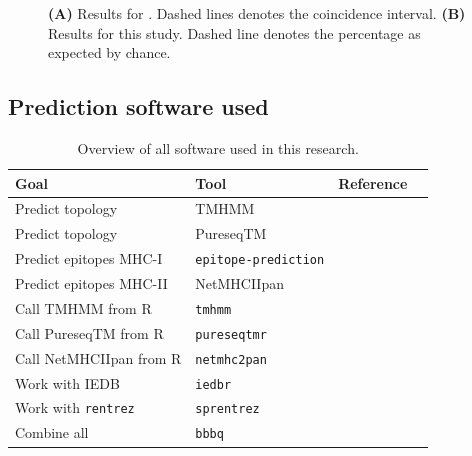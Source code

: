 \begin{figure}
  \caption{
    \textbf{(A)} 
    Results for \cite{bianchi2017}. 
    Dashed lines denotes the coincidence interval.
    \textbf{(B)}
    Results for this study.
    Dashed line denotes the percentage as expected by chance.
  }
\end{figure}

\clearpage

\subsection{Prediction software used}
\label{subsec:prediction_software_used}

\begin{table}[]
  \begin{tabular}{llll}
    Goal & Tool & Reference \\ 
    \hline
    Predict topology                  & TMHMM                     & \cite{krogh2001predicting} \\
    Predict topology                  & PureseqTM                 & \cite{wang2019efficient} \\
    Predict epitopes MHC-I            & \verb;epitope-prediction; & \cite{bianchi2017} \\
    Predict epitopes MHC-II           & NetMHCIIpan               & \cite{nielsen2008quantitative,karosiene2013netmhciipan} \\
    Call TMHMM from R                 & \verb;tmhmm;              & \cite{tmhmm} \\
    Call PureseqTM from R             & \verb;pureseqtmr;         & \cite{pureseqtmr} \\
    Call NetMHCIIpan from R           & \verb;netmhc2pan;         & \cite{netmhc2pan} \\
    Work with IEDB                    & \verb;iedbr;              & \cite{iedbr} \\
    Work with \verb;rentrez;          & \verb;sprentrez;          & \cite{sprentrez} \\
    Combine all                       & \verb;bbbq;               & \cite{bbbq}
  \end{tabular}
  \caption{
    Overview of all software used in this research.
  }
  \label{table:software_used}
\end{table}


